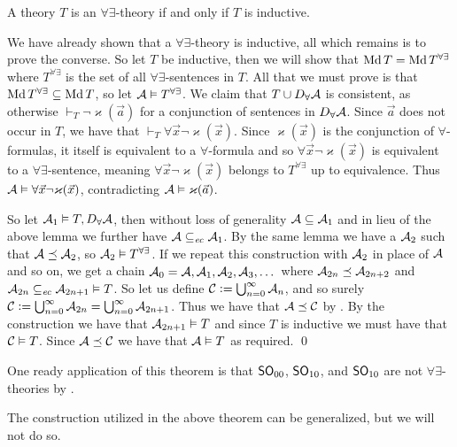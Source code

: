 \bthrm

    A theory $T$ is an $\forall\exists$-theory if and only if $T$ is inductive.

\ethrm

We have already shown that a $\forall\exists$-theory is inductive, all which remains is to prove the converse.
So let $T$ be inductive, then we will show that $\Md T=\Md T^{\forall\exists}$ where $T^{\forall\exists}$ is the set of all $\forall\exists$-sentences in $T$.
All that we must prove is that $\Md T^{\forall\exists}\subseteq\Md T$, so let ${\cal A}\vDash T^{\forall\exists}$.
We claim that $T\cup D_\forall{\cal A}$ is consistent, as otherwise $\vdash_T\neg\varkappa(\vec a)$ for a conjunction of sentences in $D_\forall{\cal A}$.
Since $\vec a$ does not occur in $T$, we have that $\vdash_T\forall\vec x\neg\varkappa(\vec x)$.
Since $\varkappa(\vec x)$ is the conjunction of $\forall$-formulas, it itself is equivalent to a $\forall$-formula and so $\forall\vec x\neg\varkappa(\vec x)$ is equivalent to a $\forall\exists$-sentence,
meaning $\forall\vec x\neg\varkappa(\vec x)$ belongs to $T^{\forall\exists}$ up to equivalence.
Thus ${\cal A}\vDash\forall\vec x\neg\varkappa(\vec x)$, contradicting ${\cal A}\vDash\varkappa(\vec a)$.

So let ${\cal A}_1\vDash T,D_\forall{\cal A}$, then without loss of generality ${\cal A}\subseteq{\cal A}_1$ and in lieu of the above lemma we further have ${\cal A}\subseteq_{\it ec}{\cal A}_1$.
By the same lemma we have a ${\cal A}_2$ such that ${\cal A}\preceq{\cal A}_2$, so ${\cal A}_2\vDash T^{\forall\exists}$.
If we repeat this construction with ${\cal A}_2$ in place of ${\cal A}$ and so on, we get a chain ${\cal A}_0={\cal A},{\cal A}_1,{\cal A}_2,{\cal A}_3,\dots$ where ${\cal A}_{2n}\preceq{\cal A}_{2n+2}$ and
${\cal A}_{2n}\subseteq_{\it ec}{\cal A}_{2n+1}\vDash T$.
So let us define ${\cal C}\coloneqq\bigcup_{n=0}^\infty{\cal A}_n$, and so surely ${\cal C}\coloneqq\bigcup_{n=0}^\infty{\cal A}_{2n}=\bigcup_{n=0}^\infty{\cal A}_{2n+1}$.
Thus we have that ${\cal A}\preceq{\cal C}$ by .
By the construction we have that ${\cal A}_{2n+1}\vDash T$ and since $T$ is inductive we must have that ${\cal C}\vDash T$.
Since ${\cal A}\preceq{\cal C}$ we have that ${\cal A}\vDash T$ as required.
\qed

One ready application of this theorem is that ${\sf SO}_{00}$, ${\sf SO}_{10}$, and ${\sf SO}_{10}$ are not $\forall\exists$-theories by .

The construction utilized in the above theorem can be generalized, but we will not do so.

